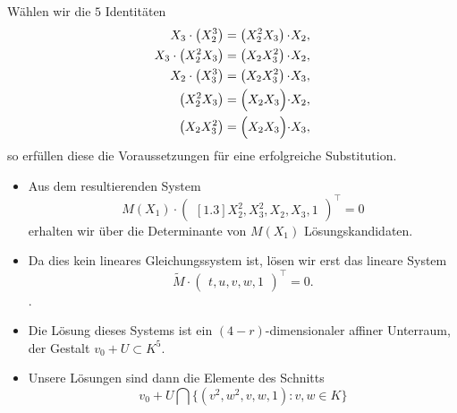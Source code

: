 \documentclass[11pt]{beamer}
\theoremstyle{custom}
\theoremstyle{custom}
\begin{document}
	\begin{frame}
		Wählen wir die $5$ Identitäten
		\begin{gather*}
			\begin{alignedat}{2}
				X_{3} \cdot \left( X_{2}^{3}\right)  &= \left( X_{2}^{2}X_{3}\right) \cdot& X_{2},\\
				X_{3}\cdot \left(X_{2}^{2}X_{3}\right) &= \left(X_{2}X_{3}^{2}\right) \cdot& X_{2},\\
				X_{2}\cdot\left( X_{3}^{3}\right) &= \left(X_{2}X_{3}^{2}\right) \cdot& X_{3},\\
				\left(X_{2}^{2}X_{3}\right)  &= \Bigl(X_{2}X_{3}\Bigr) \cdot& X_{2},\\
				\left(X_{2}X_{3}^{2}\right)  &= \Bigl(X_{2}X_{3}\Bigr) \cdot& X_{3},\\
			\end{alignedat}
		\end{gather*}
		so erfüllen diese die Voraussetzungen für eine erfolgreiche Substitution.
	\end{frame}
	\begin{frame}
		\begin{itemize}
			\item Aus dem resultierenden System
		\begin{equation*}
			M(X_{1})\cdot\begin{pmatrix}[1.3]
				X_{2}^2,
				X_{3}^2,
				X_{2},
				X_{3},
				1
			\end{pmatrix}^\top=0
		\end{equation*}
		erhalten wir über die Determinante von $M(X_{1})$ Lösungskandidaten.
		\item Da dies kein lineares Gleichungssystem ist, lösen wir erst das lineare System
		\begin{equation*}\label{eqn:low_rank_system_ind}
			\tilde{M} \cdot\begin{pmatrix}
				t,
				u,
				v,
				w,
				1
			\end{pmatrix}^\top
			=0.
		\end{equation*}.
		\item Die Lösung dieses Systems ist ein $(4-r)$-dimensionaler affiner Unterraum, der Gestalt ${v_0 + U \subset K^5}$.
		\item Unsere Lösungen sind dann die Elemente des Schnitts \begin{equation*}
			v_0 + U \bigcap \{(v^2,w^2,v,w,1) : v,w \in K\}
		\end{equation*}
		\end{itemize}
	\end{frame}
\end{document}
